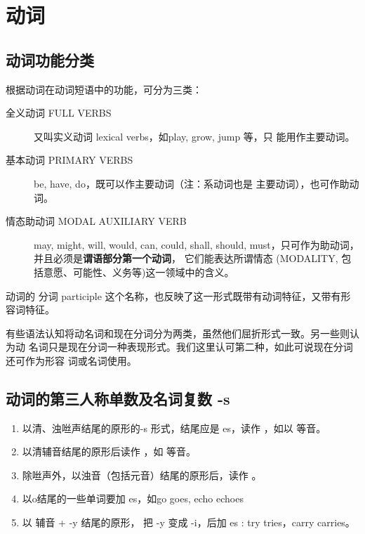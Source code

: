 \section{动词}

\subsection{动词功能分类}

根据动词在动词短语中的功能，可分为三类：
\begin{description}
\item[全义动词 FULL VERBS] 又叫实义动词 lexical verbs，如play, grow, jump 等，只
  能用作主要动词。
\item[基本动词 PRIMARY VERBS] be, have, do，既可以作主要动词（注：系动词也是
  主要动词），也可作助动词。
\item[情态助动词 MODAL AUXILIARY VERB] may, might, will, would, can, could,
  shall, should, must，只可作为助动词，并且必须是\textbf{谓语部分第一个动词}，
  它们能表达所谓情态 (MODALITY, 包括意愿、可能性、义务等)这一领域中的含义。

\end{description}

动词的 分词 participle 这个名称，也反映了这一形式既带有动词特征，又带有形容词特征。

有些语法认知将动名词和现在分词分为两类，虽然他们屈折形式一致。另一些则认为动
名词只是现在分词一种表现形式。我们这里认可第二种，如此可说现在分词还可作为形容
词或名词使用。


\subsection{动词的第三人称单数及名词复数 -s }

\begin{enumerate}
\item 以清、浊咝声结尾的原形的-s 形式，结尾应是 es，读作  ，如以
   等音。
\item 以清辅音结尾的原形后读作 ，如  等音。
\item 除咝声外，以浊音（包括元音）结尾的原形后，读作 。
\item 以o结尾的一些单词要加 es，如go  \Rightarrow goes, echo  \Rightarrow echoes
\item 以 辅音 + -y 结尾的原形， 把 -y 变成 -i，后加 es : try \Rightarrow tries，carry  \Rightarrow carries。
\end{enumerate}

